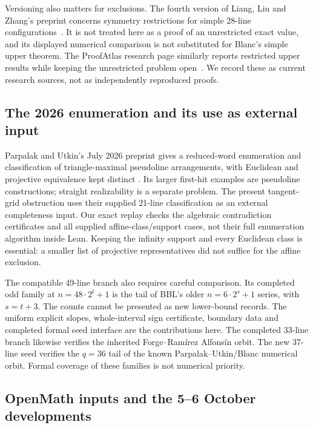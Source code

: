 Versioning also matters for exclusions. The fourth version of Liang, Liu and Zhang's preprint concerns symmetry restrictions for simple $28$-line configurations~\citep{liangliuZhang2026}. It is not treated here as a proof of an unrestricted exact value, and its displayed numerical comparison is not substituted for Blanc's simple upper theorem. The ProofAtlas research page similarly reports restricted upper results while keeping the unrestricted problem open~\citep{proofatlas2026}. We record these as current research sources, not as independently reproduced proofs.

\subsection{The 2026 enumeration and its use as external input}

Parpalak and Utkin's July 2026 preprint gives a reduced-word enumeration
and classification of triangle-maximal pseudoline arrangements, with
Euclidean and projective equivalence kept distinct
\cite{parpalakutkinEnumeration2026}. Its larger first-hit examples are
pseudoline constructions; straight realizability is a separate problem.
The present tangent-grid obstruction uses their supplied 21-line
classification as an external completeness input. Our exact replay
checks the algebraic contradiction certificates and all supplied
affine-class/support cases, not their full enumeration algorithm inside
Lean. Keeping the infinity support and every Euclidean class is
essential: a smaller list of projective representatives did not suffice
for the affine exclusion.

The compatible 49-line branch also requires careful comparison. Its
completed odd family at $n=48\cdot2^t+1$ is the tail of BBL's older
$n=6\cdot2^s+1$ series, with $s=t+3$. The counts cannot be presented as
new lower-bound records. The uniform explicit slopes, whole-interval
sign certificate, boundary data and completed formal seed interface are
the contributions here. The completed 33-line branch likewise verifies
the inherited Forge--Ram\'irez Alfons\'in orbit. The new 37-line seed
verifies the $q=36$ tail of the known Parpalak--Utkin/Blanc numerical
orbit. Formal coverage of these families is not numerical priority.

\subsection{OpenMath inputs and the 5--6 October developments}


